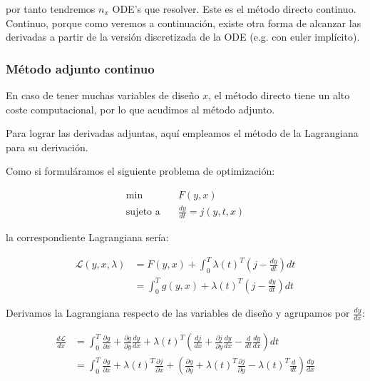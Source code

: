 por tanto tendremos $n_x$ ODE's que resolver. Este es el método directo
continuo. Continuo, porque como veremos a continuación, existe otra forma de
alcanzar las derivadas a partir de la versión discretizada de la ODE (e.g. con
euler implícito).


\subsubsection{Método adjunto continuo}

En caso de tener muchas variables de diseño $x$, el método directo tiene un
alto coste computacional, por lo que acudimos al método adjunto.

Para lograr las derivadas adjuntas, aquí empleamos el método de la Lagrangiana
para su derivación.

Como si formuláramos el siguiente problema de optimización:

\begin{align}
	\min \quad           & F(y, x)   \nonumber                                         \\
	\text{sujeto a}\quad & \frac{dy}{dt}  = j(y, t, x)  \label{eq:ode_as_optimization}
\end{align}

la correspondiente Lagrangiana sería:

\begin{align}
	\mathcal{L}(y, x, \lambda) & = F(y, x) + \int_0^T \lambda(t)^T(j - \frac{dy}{dt})dt \nonumber                                   \\
	                           & = \int_0^T g(y, x) + \lambda(t)^T (j - \frac{dy}{dt}) dt  \label{eq:continuous_adjoint_lagrangian}
\end{align}

Derivamos la Lagrangiana respecto de las variables de diseño y agrupamos por
$\frac{dy}{dx}$:

\begin{align}
	\frac{d \mathcal{L}}{d x} & = \int_0^T \frac{\partial g}{\partial x} + \frac{\partial g}{\partial y} \frac{dy}{dx} + \lambda(t)^T \left(\frac{dj}{dx} + \frac{\partial j}{\partial y} \frac{dy}{dx} - \frac{d}{d t} \frac{dy}{dx} \right) dt   \nonumber                                              \\
	                          & = \int_0^T  \frac{\partial g}{\partial x} + \lambda(t)^T  \frac{\partial j}{\partial x} + \left(  \frac{\partial g}{\partial y} + \lambda(t)^T  \frac{\partial j}{\partial y} - \lambda(t)^T \frac{d}{dt}  \right) \frac{dy}{dx}  \label{eq:dl_dx_ode_continuous_adjoint}
\end{align}

